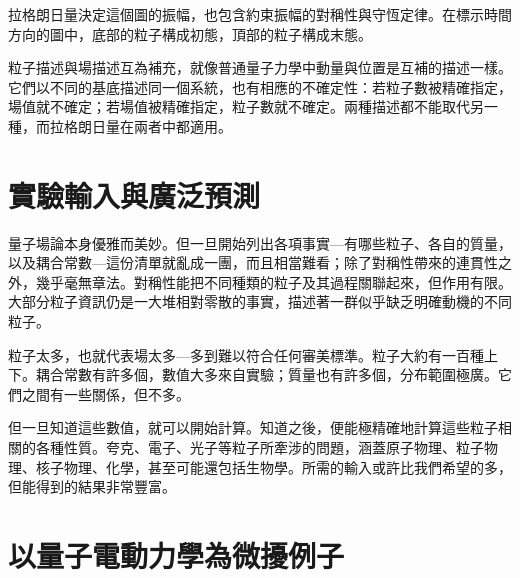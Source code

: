 拉格朗日量決定這個圖的振幅，也包含約束振幅的對稱性與守恆定律。在標示時間方向的圖中，底部的粒子構成初態，頂部的粒子構成末態。

\begin{classroomqa}
\end{classroomqa}

粒子描述與場描述互為補充，就像普通量子力學中動量與位置是互補的描述一樣。它們以不同的基底描述同一個系統，也有相應的不確定性：若粒子數被精確指定，場值就不確定；若場值被精確指定，粒子數就不確定。兩種描述都不能取代另一種，而拉格朗日量在兩者中都適用。

\begin{classroomqa}
\end{classroomqa}

\section{實驗輸入與廣泛預測}

量子場論本身優雅而美妙。但一旦開始列出各項事實---有哪些粒子、各自的質量，以及耦合常數---這份清單就亂成一團，而且相當難看；除了對稱性帶來的連貫性之外，幾乎毫無章法。對稱性能把不同種類的粒子及其過程關聯起來，但作用有限。大部分粒子資訊仍是一大堆相對零散的事實，描述著一群似乎缺乏明確動機的不同粒子。

\begin{classroomqa}
\end{classroomqa}

粒子太多，也就代表場太多---多到難以符合任何審美標準。粒子大約有一百種上下。耦合常數有許多個，數值大多來自實驗；質量也有許多個，分布範圍極廣。它們之間有一些關係，但不多。

但一旦知道這些數值，就可以開始計算。知道之後，便能極精確地計算這些粒子相關的各種性質。夸克、電子、光子等粒子所牽涉的問題，涵蓋原子物理、粒子物理、核子物理、化學，甚至可能還包括生物學。所需的輸入或許比我們希望的多，但能得到的結果非常豐富。

\section{以量子電動力學為微擾例子}

